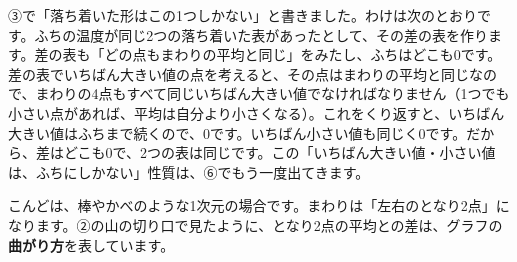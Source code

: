 \begin{seikaku}
③で「落ち着いた形はこの1つしかない」と書きました。わけは次のとおりです。ふちの温度が同じ2つの落ち着いた表があったとして、その差の表を作ります。差の表も「どの点もまわりの平均と同じ」をみたし、ふちはどこも0です。差の表でいちばん大きい値の点を考えると、その点はまわりの平均と同じなので、まわりの4点もすべて同じいちばん大きい値でなければなりません（1つでも小さい点があれば、平均は自分より小さくなる）。これをくり返すと、いちばん大きい値はふちまで続くので、0です。いちばん小さい値も同じく0です。だから、差はどこも0で、2つの表は同じです。この「いちばん大きい値・小さい値は、ふちにしかない」性質は、⑥でもう一度出てきます。
\end{seikaku}


\label{bk:8-12:ichi}こんどは、棒やかべのような1次元の場合です。まわりは「左右のとなり2点」になります。②の山の切り口で見たように、となり2点の平均との差は、グラフの\textbf{曲がり方}を表しています。

